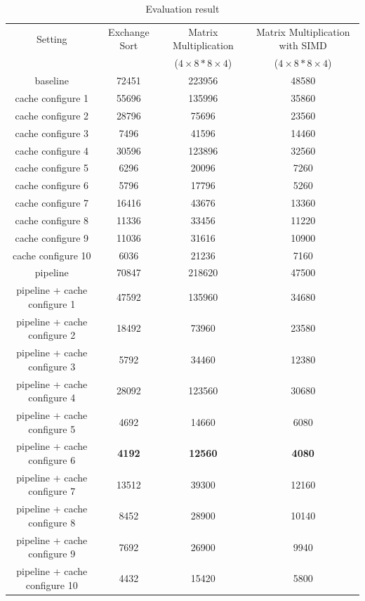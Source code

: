 \documentclass{sig-alternate}
\begin{document}
\begin{table}[!ht]
\caption{Evaluation result}
\label{tab:res}
\centering
\begin{tabular}{|c|c|c|c|}
\hline
 Setting & Exchange Sort & Matrix Multiplication  & Matrix Multiplication with SIMD\\

 & & ($4\times8 * 8 \times 4$) & ($4\times8 * 8 \times 4$) \\ \hline
baseline & 72451 & 223956 & 48580 \\
\hline
cache configure 1& 55696 & 135996 & 35860 \\
\hline
cache configure 2 & 28796 & 75696 & 23560\\
\hline
cache configure 3 & 7496& 41596& 14460\\
\hline
cache configure 4 & 30596& 123896& 32560\\
\hline
cache configure 5& 6296& 20096 & 7260 \\
\hline
cache configure 6 & 5796 & 17796 & 5260 \\
\hline
cache configure 7 & 16416 & 43676 & 13360\\
\hline
cache configure 8 & 11336 & 33456 & 11220\\
\hline
cache configure 9 & 11036 & 31616 & 10900 \\
\hline
cache configure 10 & 6036 & 21236 & 7160 \\
\hline
pipeline &70847 & 218620 & 47500 \\
\hline
pipeline + cache configure 1 & 47592 & 135960 & 34680\\
\hline 
pipeline + cache configure 2 & 18492 & 73960 & 23580\\
\hline
pipeline + cache configure 3 & 5792 & 34460 & 12380\\
\hline
pipeline + cache configure 4 & 28092 & 123560 & 30680\\
\hline
pipeline + cache configure 5 & 4692 & 14660 & 6080\\
\hline 
pipeline + cache configure 6 & \textbf{4192}& \textbf{12560} & \textbf{4080}\\
\hline
pipeline + cache configure 7 & 13512& 39300& 12160\\
\hline
pipeline + cache configure 8 & 8452& 28900& 10140\\
\hline
pipeline + cache configure 9 & 7692& 26900& 9940\\
\hline
pipeline + cache configure 10 & 4432& 15420& 5800\\
\hline
\end{tabular}
\end{table}
\end{document}
